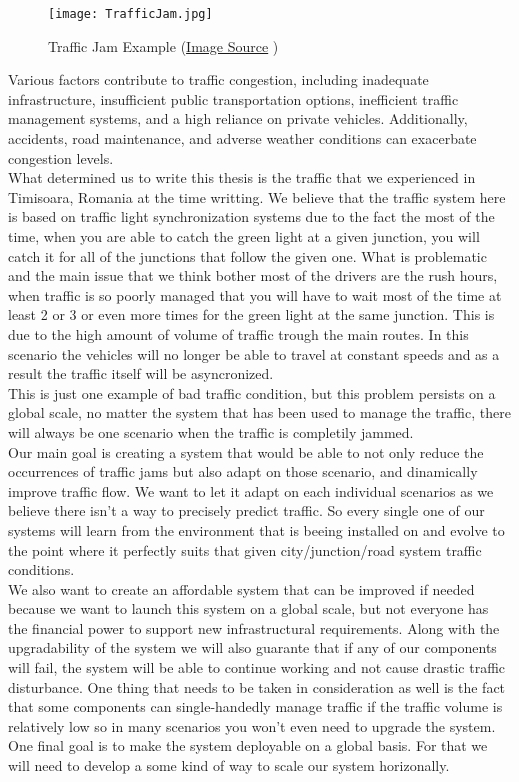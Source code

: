 \documentclass[17pt]{report}
\begin{document}
\begin{figure}[h!]
    \texttt{[image: TrafficJam.jpg]}
    \caption{Traffic Jam Example 
    (\href{https://unsplash.com/photos/cekJ1XXx1Rk}{Image Source} \textcopyright)}
    \label{fig:TrafficJam}
\end{figure}


Various factors contribute to traffic congestion, including
inadequate infrastructure, insufficient public transportation options,
inefficient traffic management systems, and a high reliance on private
vehicles. Additionally, accidents, road maintenance, and adverse
weather conditions can exacerbate congestion levels. \\
\indent 
What determined us to  write this thesis is the traffic that we 
experienced in Timisoara, Romania at the time writting. We believe that
the traffic system here is based on traffic light synchronization systems 
due to the fact the most of the time, when you are able to catch the 
green light at a given junction, you will catch it for all of the junctions 
that follow the given one. What is problematic and the main issue that 
we think bother most of the drivers are the rush hours, when traffic 
is so poorly managed that you will have to wait most of the time at least 
2 or 3 or even more times for the green light at the same junction. This 
is due to the high amount of volume of traffic trough the main routes. In 
this scenario the vehicles will no longer be able to travel at constant 
speeds and as a result the traffic itself will be asyncronized. \\
\indent
This is just one example of bad traffic condition, but this problem 
persists on a global scale, no matter the system that has been used to 
manage the traffic, there will always be one scenario when the traffic 
is completily jammed. \\
\indent
Our main goal is creating a system that would be able to not only reduce 
the occurrences of traffic jams but also adapt on those scenario, and 
dinamically improve traffic flow. We want to let it adapt on each 
individual scenarios as we believe there isn't a way to precisely 
predict traffic. So every single one of our systems will learn from 
the environment that is beeing installed on and evolve to the point 
where it perfectly suits that given city/junction/road system 
traffic conditions. \\
\indent 
We also want to create an affordable system that can be improved if 
needed because we want to launch this system on a global scale, but not 
everyone has the financial power to support new infrastructural requirements. 
Along with the upgradability of the system we will also guarante that 
if any of our components will fail, the system will be able to continue
working and not cause drastic traffic disturbance. One thing that needs
to be taken in consideration as well is the fact that some components 
can single-handedly manage traffic if the traffic volume is relatively 
low so in many scenarios you won't even need to upgrade the system. \\
\indent
One final goal is to make the system deployable on a global basis. For 
that we will need to develop a some kind of way to scale our system 
horizonally.
\end{document}

